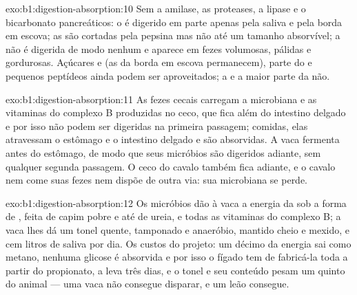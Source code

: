 \begin{solution}{exo:b1:digestion-absorption:10}
Sem a amilase, as proteases, a lipase e o bicarbonato pancreáticos: o
 é digerido em parte apenas pela saliva e pela borda em escova;
as  são cortadas pela pepsina mas não até um tamanho
absorvível; a  não é digerida de modo nenhum e aparece em fezes
volumosas, pálidas e gordurosas. Açúcares e  (as 
da borda em escova permanecem), parte do  e pequenos peptídeos
ainda podem ser aproveitados; a  e a maior parte da 
não.
\end{solution}

\begin{solution}{exo:b1:digestion-absorption:11}
As fezes cecais carregam a  microbiana e as vitaminas do
complexo B produzidas no ceco, que fica além do intestino delgado e
por isso não podem ser digeridas na primeira passagem; comidas, elas
atravessam o estômago e o intestino delgado e são absorvidas. A vaca
fermenta antes do estômago, de modo que seus micróbios são digeridos
adiante, sem qualquer segunda passagem. O ceco do cavalo também fica
adiante, e o cavalo nem come suas fezes nem dispõe de outra via: sua
 microbiana se perde.
\end{solution}

\begin{solution}{exo:b1:digestion-absorption:12}
Os micróbios dão à vaca a energia da  sob a forma de ,  feita de capim pobre e até de ureia, e todas as
vitaminas do complexo B; a vaca lhes dá um tonel quente, tamponado e
anaeróbio, mantido cheio e mexido, e cem litros de saliva por dia. Os
custos do projeto: um décimo da energia sai como metano, nenhuma
glicose é absorvida e por isso o fígado tem de fabricá-la toda a
partir do propionato, a  leva três dias, e o tonel e seu
conteúdo pesam um quinto do animal --- uma vaca não consegue disparar,
e um leão consegue.
\end{solution}


